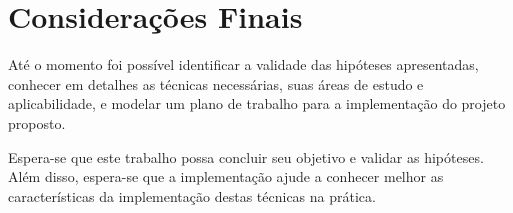 \chapter{Considerações Finais}

Até o momento foi possível identificar a validade das hipóteses
apresentadas, conhecer em detalhes as técnicas necessárias, suas áreas de
estudo e aplicabilidade, e modelar um plano de trabalho para a
implementação do projeto proposto.

Espera-se que este trabalho possa concluir seu objetivo e validar as
hipóteses. Além disso, espera-se que a implementação ajude a conhecer
melhor as características da implementação destas técnicas na prática.
